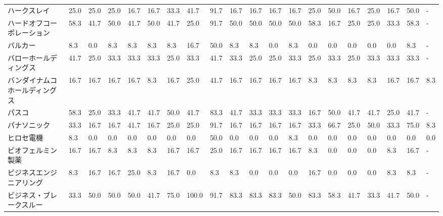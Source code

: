 \begin{tabular}{llllllllllllllllllll}
ハークスレイ          &   25.0 &   25.0 &      25.0 &      16.7 &       16.7 &   33.3 &   41.7 &   91.7 &    16.7 &    16.7 &   16.7 &  16.7 &   25.0 &    50.0 &    16.7 &  25.0 &  16.7 &  50.0 &     - \\
ハードオフコーポレーション   &   58.3 &   41.7 &      50.0 &      41.7 &       50.0 &   41.7 &   25.0 &   91.7 &    50.0 &    50.0 &   50.0 &  50.0 &   58.3 &    16.7 &    25.0 &  25.0 &  33.3 &  58.3 &     - \\
バルカー            &    8.3 &    0.0 &       8.3 &       8.3 &        8.3 &    8.3 &   16.7 &   50.0 &     8.3 &     8.3 &    0.0 &   8.3 &    0.0 &     0.0 &     0.0 &   0.0 &   0.0 &   8.3 &     - \\
バローホールディングス     &   41.7 &   25.0 &      33.3 &      33.3 &       33.3 &   25.0 &   33.3 &   41.7 &    33.3 &    25.0 &   25.0 &  33.3 &   25.0 &    33.3 &    25.0 &  33.3 &  33.3 &  33.3 &     - \\
バンダイナムコホールディングス &   16.7 &   16.7 &      16.7 &      16.7 &        8.3 &   16.7 &   25.0 &   41.7 &    16.7 &    16.7 &   16.7 &  16.7 &    8.3 &     8.3 &     8.3 &   8.3 &  16.7 &  16.7 &   8.3 \\
パスコ             &   58.3 &   25.0 &      33.3 &      41.7 &       41.7 &   50.0 &   41.7 &   83.3 &    41.7 &    33.3 &   33.3 &  33.3 &   16.7 &    50.0 &    41.7 &  41.7 &  25.0 &  41.7 &     - \\
パナソニック          &   33.3 &   16.7 &      16.7 &      41.7 &       16.7 &   25.0 &   25.0 &   91.7 &    16.7 &    16.7 &   16.7 &  16.7 &   33.3 &    66.7 &    25.0 &  50.0 &  33.3 &  75.0 &   8.3 \\
ヒロセ電機           &    8.3 &    0.0 &       0.0 &       0.0 &        0.0 &    0.0 &    0.0 &   50.0 &     0.0 &     0.0 &    0.0 &   8.3 &    0.0 &     0.0 &     0.0 &   0.0 &   0.0 &   0.0 &   0.0 \\
ビオフェルミン製薬       &   16.7 &   16.7 &       8.3 &       8.3 &        8.3 &   16.7 &   16.7 &   25.0 &    16.7 &    16.7 &   16.7 &  16.7 &    8.3 &     0.0 &     0.0 &   0.0 &   8.3 &  16.7 &     - \\
ビジネスエンジニアリング    &    8.3 &   16.7 &      16.7 &      25.0 &        8.3 &   16.7 &    0.0 &    8.3 &     8.3 &     0.0 &    0.0 &   0.0 &   16.7 &     0.0 &     0.0 &   0.0 &   8.3 &   8.3 &     - \\
ビジネス・ブレークスルー    &   33.3 &   50.0 &      50.0 &      50.0 &       41.7 &   75.0 &  100.0 &   91.7 &    83.3 &    83.3 &   83.3 &  50.0 &   83.3 &    58.3 &    41.7 &  33.3 &  41.7 &  50.0 &     - \\

\end{tabular}
